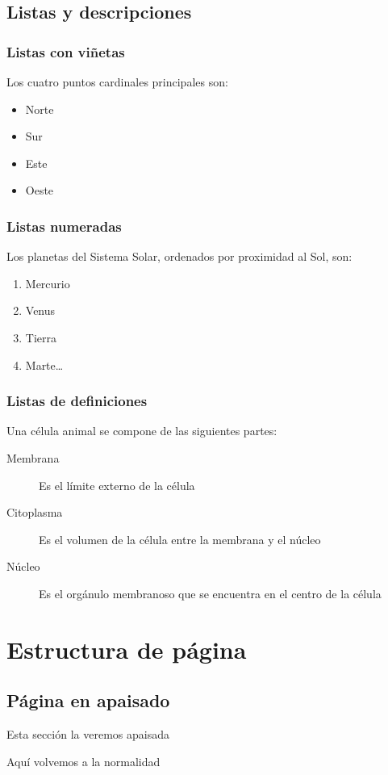 \documentclass[11pt,twoside,a4paper]{article}
\begin{document}
\subsection{Listas y descripciones}
\label{sec:listasdescripciones}

\subsubsection{Listas con viñetas}
\label{sec:listasviñetas}

Los cuatro puntos cardinales principales son:
\begin{itemize}
\item Norte
\item Sur
\item Este
\item Oeste
\end{itemize}

\subsubsection{Listas numeradas}
\label{sec:listasnumeradas}

Los planetas del Sistema Solar, ordenados por proximidad al Sol, son:
\begin{enumerate}
\item Mercurio
\item Venus
\item Tierra
\item Marte\ldots{}
\end{enumerate}

\subsubsection{Listas de definiciones}
\label{sec:listasdefiniciones}

Una célula animal se compone de las siguientes partes:
\begin{description}
\item[Membrana] Es el límite externo de la célula
\item[Citoplasma] Es el volumen de la célula entre la membrana y el núcleo
\item[Núcleo] Es el orgánulo membranoso que se encuentra en el centro de la célula
\end{description}
\newpage{}
\section{Estructura de página}
\label{sec:estructurapagina}
\layout{}

\thispagestyle{empty}
\begin{landscape}
\thispagestyle{empty}
  \subsection{Página en apaisado}
  \label{sec:apaisado}
Esta sección la veremos apaisada
  
\end{landscape}
\newpage
Aquí volvemos a la normalidad
\end{document}
